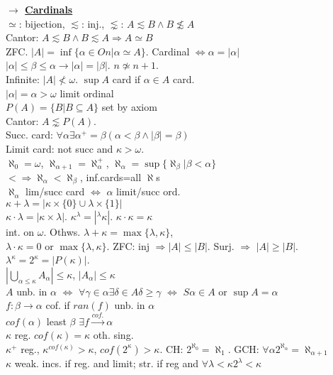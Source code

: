 \documentclass[9pt]{article}
\newcommand{\mytitle}[1]{ {\bf $\rightarrow$ \underline{#1}}\\}
\begin{document}
\begin{multicols*}{2}
\mytitle{Cardinals}
$\simeq$: bijection, $\lesssim$: inj., $\lnsim$: $A\lesssim B\wedge B\not\lesssim A$\\
Cantor: $A\lesssim B\wedge B\lesssim A\Rightarrow A\simeq B$\\
ZFC. $|A|=\inf\{\alpha\in On|\alpha\simeq A\}$. Cardinal $\Leftrightarrow \alpha=|\alpha|$\\
$|\alpha|\leqslant \beta\leqslant \alpha\rightarrow |\alpha|=|\beta|$. $n\not\simeq n+1$.\\
Infinite: $|A|\not<\omega$. $\sup A$ card if $\alpha\in A$ card.\\
$|\alpha|=\alpha>\omega$ limit ordinal\\
$P(A)=\{B|B\subseteq A\}$ set by axiom\\
Cantor: $A\lnsim P(A)$.\\
Succ. card: $\forall\alpha\exists\alpha^+=\beta(\alpha<\beta\wedge|\beta|=\beta)$\\
Limit card: not succ and $\kappa>\omega$.\\
$\aleph_0=\omega$, $\aleph_{\alpha+1}=\aleph_{\alpha}^+$, $\aleph_\alpha=\sup\{\aleph_{\beta}|\beta<\alpha\}$\\
$<\Rightarrow\aleph_\alpha<\aleph_\beta$, inf.cards=all $\aleph$s\\
$\aleph_\alpha$ lim/succ card $\Leftrightarrow$ $\alpha$ limit/succ ord.\\
$\kappa+\lambda=|\kappa\times\{0\}\cup\lambda\times\{1\}|$\\
$\kappa\cdot\lambda=|\kappa\times\lambda|$. $\kappa^\lambda=|^\lambda\kappa|$. $\kappa\cdot\kappa=\kappa$\\
int. on $\omega$. Othws. $\lambda+\kappa=\max\{\lambda,\kappa\}$,\\
$\lambda\cdot \kappa=0$ or $\max\{\lambda,\kappa\}$.
ZFC: inj $\Rightarrow |A|\leqslant |B|$. Surj. $\Rightarrow$ $|A|\geqslant |B|$.\\
$\lambda^\kappa=2^\kappa=|P(\kappa)|$.\\
$|\bigcup\limits_{\alpha\leqslant \kappa}A_\alpha|\leqslant\kappa$, $|A_\alpha|\leqslant\kappa$\\
$A$ unb. in $\alpha$ $\Leftrightarrow$ $\forall\gamma\in\alpha\exists\delta\in A\delta\geqslant\gamma$ $\Leftrightarrow$ $S\alpha\in A$ or $\sup A=\alpha$\\
$f\colon\beta\to\alpha$ cof. if $ran(f)$ unb. in $\alpha$\\
$cof(\alpha)$ least $\beta$ $\exists f\overset{cof.}{\to}\alpha$\\
$\kappa$ reg. $cof(\kappa)=\kappa$ oth. sing.\\
$\kappa^+$ reg., $\kappa^{cof(\kappa)}>\kappa$, $cof(2^\kappa)>\kappa$.
CH: $2^{\aleph_0}=\aleph_1$. GCH: $\forall\alpha 2^{\aleph_\alpha}=\aleph_{\alpha+1}$\\
$\kappa$ weak. incs. if reg. and limit; str. if reg and $\forall\lambda<\kappa 2^\lambda<\kappa$\\


\end{multicols*}
\end{document}
